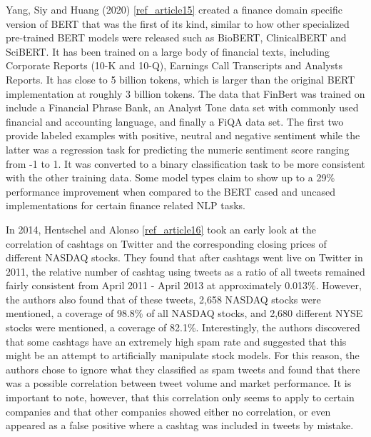 \documentclass{llncs}
\begin{document}
Yang, Siy and Huang (2020) \ref{ref_article15} created a finance domain specific version of BERT that was the first of its kind, similar to how other specialized pre-trained BERT models were released such as BioBERT, ClinicalBERT and SciBERT.  It has been trained on a large body of financial texts, including Corporate Reports (10-K  and 10-Q), Earnings Call Transcripts and Analysts Reports.  It has close to 5 billion tokens, which is larger than the original BERT implementation at roughly 3 billion tokens.  The data that FinBert was trained on include a Financial Phrase Bank, an Analyst Tone data set with commonly used financial and accounting language, and finally a FiQA data set.  The first two provide labeled examples with positive, neutral and negative sentiment while the latter was a regression task for predicting the numeric sentiment score ranging from -1 to 1.  It was converted to a binary classification task to be more consistent with the other training data.  Some model types claim to show up to a 29\% performance improvement when compared to the BERT cased and uncased implementations for certain finance related NLP tasks.

In 2014, Hentschel and Alonso \ref{ref_article16} took an early look at the correlation of cashtags on Twitter and the corresponding closing prices of different NASDAQ stocks. They found that after cashtags went live on Twitter in 2011, the relative number of cashtag using tweets as a ratio of all tweets remained fairly consistent from April 2011 - April 2013 at approximately 0.013\%. However, the authors also found that of these tweets, 2,658 NASDAQ stocks were mentioned, a coverage of 98.8\% of all NASDAQ stocks, and 2,680 different NYSE stocks were mentioned, a coverage of 82.1\%. Interestingly, the authors discovered that some cashtags have an extremely high spam rate and suggested that this might be an attempt to artificially manipulate stock models. For this reason, the authors chose to ignore what they classified as spam tweets and found that there was a possible correlation between tweet volume and market performance. It is important to note, however, that this correlation only seems to apply to certain companies and that other companies showed either no correlation, or even appeared as a false positive where a cashtag was included in tweets by mistake.
\end{document}
